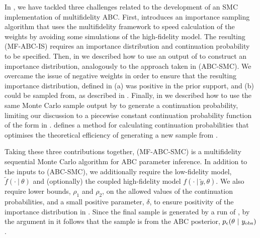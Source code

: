 \documentclass[review]{siamonline190516}
\begin{document}
In , we have tackled three challenges related to the development of an SMC implementation of multifidelity ABC.
First,  introduces an importance sampling algorithm that uses the multifidelity framework to speed calculation of the weights by avoiding some simulations of the high-fidelity model.
The resulting  (MF-ABC-IS) requires an importance distribution and continuation probability to be specified.
Then, in  we described how to use an output of  to construct an importance distribution, analogously to the approach taken in  (ABC-SMC).
We overcame the issue of negative weights in order to ensure that the resulting importance distribution, defined in 
(a) was positive in the prior support,
and (b) could be sampled from, as described in .
Finally, in  we described how to use the same Monte Carlo sample output by  to generate a continuation probability, limiting our discussion to a piecewise constant continuation probability function of the form in .
 defines a method for calculating continuation probabilities that optimises the theoretical efficiency of generating a new sample from .

Taking these three contributions together,  (MF-ABC-SMC) is a multifidelity sequential Monte Carlo algorithm for ABC parameter inference.
In addition to the inputs to  (ABC-SMC), we additionally require the low-fidelity model, $\tilde f(\cdot~|~\theta)$ and (optionally) the coupled high-fidelity model $f(\cdot~|~\tilde y,\theta)$.
We also require lower bounds, $\rho_1$ and $\rho_2$, on the allowed values of the continuation probabilities, and a small positive parameter, $\delta$, to ensure positivity of the importance distribution in .
Since the final sample is generated by a run of , by the argument in  it follows that the sample is from the ABC posterior, $p_\epsilon(\theta~|~y_{\mathrm{obs}})$.
\end{document}
